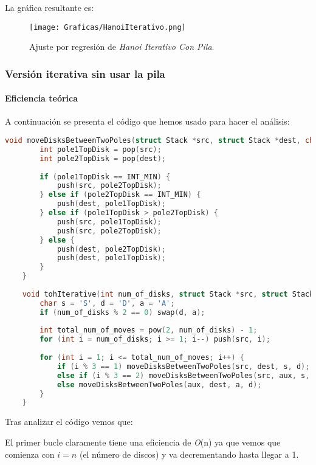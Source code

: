 \documentclass[a4paper,12pt]{article} %
\begin{document}
La gráfica resultante es:
\begin{figure}[H]
	\centering
	\texttt{[image: Graficas/HanoiIterativo.png]}
	\caption{Ajuste por regresión de \textit{Hanoi Iterativo Con Pila}.}
\end{figure}


\subsubsection{Versión iterativa sin usar la pila}

\paragraph{Eficiencia teórica}

A continuación se presenta el código que hemos usado para hacer el análisis:

\begin{lstlisting}[language=C, caption={Código de Hanoi Iterativo sin pila}]
	void moveDisksBetweenTwoPoles(struct Stack *src, struct Stack *dest, char s, char d) {
		int pole1TopDisk = pop(src);
		int pole2TopDisk = pop(dest);
	
		if (pole1TopDisk == INT_MIN) {
			push(src, pole2TopDisk);
		} else if (pole2TopDisk == INT_MIN) {
			push(dest, pole1TopDisk);
		} else if (pole1TopDisk > pole2TopDisk) {
			push(src, pole1TopDisk);
			push(src, pole2TopDisk);
		} else {
			push(dest, pole2TopDisk);
			push(dest, pole1TopDisk);
		}
	}
	
	void tohIterative(int num_of_disks, struct Stack *src, struct Stack *aux, struct Stack *dest) {
		char s = 'S', d = 'D', a = 'A';
		if (num_of_disks % 2 == 0) swap(d, a);
	
		int total_num_of_moves = pow(2, num_of_disks) - 1;
		for (int i = num_of_disks; i >= 1; i--) push(src, i);
	
		for (int i = 1; i <= total_num_of_moves; i++) {
			if (i % 3 == 1) moveDisksBetweenTwoPoles(src, dest, s, d);
			else if (i % 3 == 2) moveDisksBetweenTwoPoles(src, aux, s, a);
			else moveDisksBetweenTwoPoles(aux, dest, a, d);
		}
	}
\end{lstlisting}

Tras analizar el código vemos que:

El primer bucle claramente tiene una eficiencia de \textit{O}(n) ya que vemos que comienza con $i=n$ (el número de discos)
y va decrementando hasta llegar a 1.\\
\end{document}
